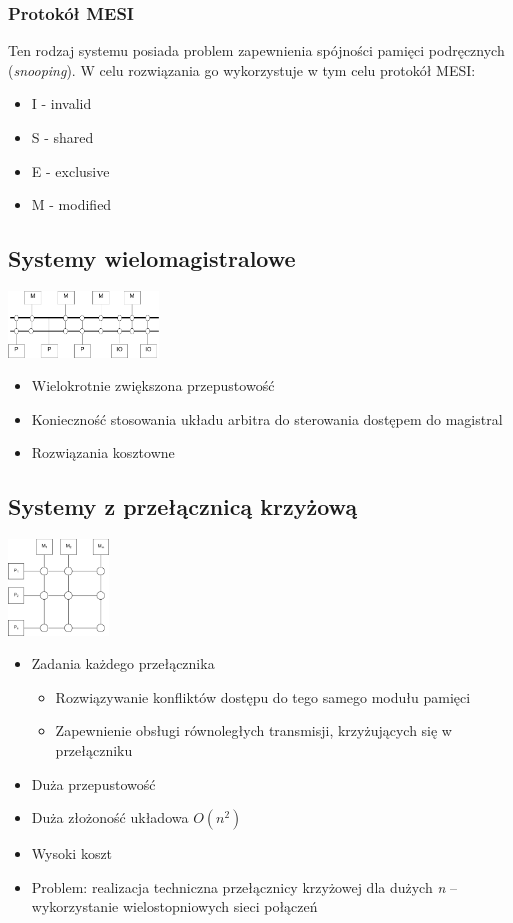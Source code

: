 		\subsubsection{Protokół MESI}
			Ten rodzaj systemu posiada problem zapewnienia spójności pamięci podręcznych (\emph{snooping}). W celu rozwiązania go wykorzystuje w tym celu protokół MESI:
			\begin{itemize}
				\item I - invalid
				\item S - shared
				\item E - exclusive
				\item M - modified
			\end{itemize}
	\subsection{Systemy wielomagistralowe}
		\includegraphics[width=0.3\textwidth]{./images/wieloproc01}
		\begin{itemize}
			\item Wielokrotnie zwiększona przepustowość
			\item Konieczność stosowania układu arbitra do sterowania dostępem do magistral
			\item Rozwiązania kosztowne
		\end{itemize}
	\subsection{Systemy z przełącznicą krzyżową}
		\includegraphics[width=0.2\textwidth]{./images/wieloproc02}
		\begin{itemize}
			\item Zadania każdego przełącznika
			\begin{itemize}
				\item Rozwiązywanie konfliktów dostępu do tego samego modułu pamięci
				\item Zapewnienie obsługi równoległych transmisji, krzyżujących się w przełączniku
			\end{itemize}
			\item Duża przepustowość
			\item Duża złożoność układowa $ O(n^2) $
			\item Wysoki koszt
			\item Problem: realizacja techniczna przełącznicy krzyżowej dla dużych \emph{n} – wykorzystanie wielostopniowych sieci połączeń
		\end{itemize}
